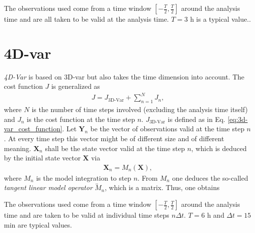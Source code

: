 \documentclass{article}
\begin{document}
The observations used come from a time window $\left[-\frac{T}{2}, \frac{T}{2}\right]$ around the analysis time and are all taken to be valid at the analysis time. $T = 3$ h is a typical value..

\section{4D-var}
\label{sec:4d-var}

\textit{4D-Var} is based on 3D-var but also takes the time dimension into account. The cost function $J$ is generalized as
%
\begin{eqnarray}
J = J_{\text{3D-Var}} + \sum_{n = 1}^NJ_n,
\end{eqnarray}
%
where $N$ is the number of time steps involved (excluding the analysis time itself) and $J_n$ is the cost function at the time step $n$. $J_{\text{3D-Var}}$ is defined as in Eq. \eqref{eq:3d-var_cost_function}. Let $\mathbf{Y}_n$ be the vector of observations valid at the time step $n$. At every time step this vector might be of different size and of different meaning. $\mathbf{X}_n$ shall be the state vector valid at the time step $n$, which is deduced by the initial state vector $\mathbf{X}$ via
%
\begin{eqnarray}
\mathbf{X}_n = M_n\left(\mathbf{X}\right),
\end{eqnarray}
%
where $M_n$ is the model integration to step $n$. From $M_n$ one deduces the so-called \textit{tangent linear model operator} $\overleftrightarrow{M}_n$, which is a matrix. Thus, one obtains
%
\begin{center}
\end{center}
%
The observations used come from a time window $\left[-\frac{T}{2}, \frac{T}{2}\right]$ around the analysis time and are taken to be valid at individual time steps $n\Delta t$. $T = 6$ h and $\Delta t = 15$ min are typical values.

\appendix

\printbibliography
\end{document}
